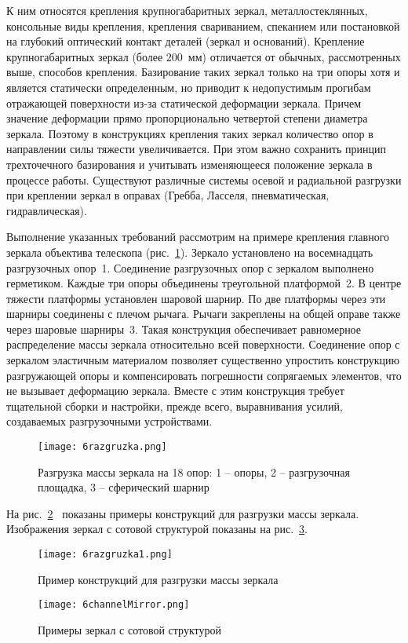К ним относятся крепления крупногабаритных зеркал, металлостеклянных, консольные виды крепления, крепления свариванием, спеканием или постановкой на глубокий оптический контакт деталей (зеркал и оснований). Крепление крупногабаритных зеркал (более 200~мм) отличается от обычных, рассмотренных выше, способов крепления. Базирование таких зеркал только на три опоры хотя и является статически определенным, но приводит к недопустимым прогибам отражающей поверхности из-за статической деформации зеркала. Причем значение деформации прямо пропорционально четвертой степени диаметра зеркала. Поэтому в конструкциях крепления таких зеркал количество опор в направлении силы тяжести увеличивается. При этом важно сохранить принцип трехточечного базирования и учитывать изменяющееся положение зеркала в процессе работы. Существуют различные системы осевой и радиальной разгрузки при креплении зеркал в оправах (Гребба, Ласселя, пневматическая, гидравлическая).

Выполнение указанных требований рассмотрим на примере крепления главного зеркала объектива телескопа (рис.~\ref{pic:6razgruzka}). Зеркало установлено на восемнадцать разгрузочных опор~1. Соединение разгрузочных опор с зеркалом выполнено герметиком. Каждые три опоры объединены треугольной платформой~2. В центре тяжести платформы установлен шаровой шарнир. По две платформы через эти шарниры соединены с плечом рычага. Рычаги закреплены на общей оправе также через шаровые шарниры~3. Такая конструкция обеспечивает равномерное распределение массы зеркала относительно всей поверхности. Соединение опор с зеркалом эластичным материалом позволяет существенно упростить конструкцию разгружающей опоры и компенсировать погрешности сопрягаемых элементов, что не вызывает деформацию зеркала. Вместе с этим конструкция требует тщательной сборки и настройки, прежде всего, выравнивания усилий, создаваемых разгрузочными устройствами.

\begin{figure}[h!]
	\caption{ Разгрузка массы зеркала на 18 опор: 1 -- опоры, 2 -- разгрузочная площадка, 3 -- сферический шарнир }
	\texttt{[image: 6razgruzka.png]}
	\label{pic:6razgruzka}
\end{figure}

На рис.~\ref{pic:6razgruzka1}~ показаны примеры конструкций для разгрузки массы зеркала. Изображения зеркал с сотовой структурой показаны на рис.~\ref{pic:6channelMirror}.

\begin{landscape}
	
	\begin{figure}[h!]
		\caption{ Пример конструкций для разгрузки массы зеркала }
		\texttt{[image: 6razgruzka1.png]}
		\label{pic:6razgruzka1}
	\end{figure}
	
	\begin{figure}[h!]
		\caption{ Примеры зеркал с сотовой структурой }
		\texttt{[image: 6channelMirror.png]}
		\label{pic:6channelMirror}
	\end{figure}
	
\end{landscape}

